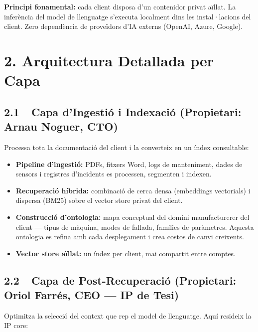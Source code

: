 \documentclass[11pt,a4paper]{article}
\begin{document}
\vspace{0.3em}

\begin{ipbox}
\textbf{Principi fonamental:} cada client disposa d'un contenidor privat aïllat. La inferència del model de llenguatge s'executa localment dins les instal·lacions del client. Zero dependència de proveïdors d'IA externs (OpenAI, Azure, Google).
\end{ipbox}

\section{2. Arquitectura Detallada per Capa}

\subsection{2.1~~Capa d'Ingestió i Indexació \textnormal{\small (Propietari: Arnau Noguer, CTO)}}

Processa tota la documentació del client i la converteix en un índex consultable:

\begin{itemize}[leftmargin=1.5em,itemsep=2pt]
\item \textbf{Pipeline d'ingestió:} PDFs, fitxers Word, logs de manteniment, dades de sensors i registres d'incidents es processen, segmenten i indexen.
\item \textbf{Recuperació híbrida:} combinació de cerca densa (embeddings vectorials) i dispersa (BM25) sobre el vector store privat del client.
\item \textbf{Construcció d'ontologia:} mapa conceptual del domini manufacturerer del client --- tipus de màquina, modes de fallada, famílies de paràmetres. Aquesta ontologia es refina amb cada desplegament i crea costos de canvi creixents.
\item \textbf{Vector store aïllat:} un índex per client, mai compartit entre comptes.
\end{itemize}

\subsection{2.2~~Capa de Post-Recuperació \textnormal{\small (Propietari: Oriol Farrés, CEO --- IP de Tesi)}}

Optimitza la selecció del context que rep el model de llenguatge. Aquí resideix la IP core:
\end{document}
